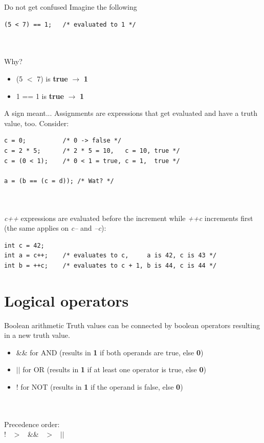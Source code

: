 \begin{frame}[fragile]{Do not get confused}
	Imagine the following
	\begin{lstlisting}[numbers=none]
(5 < 7) == 1;   /* evaluated to 1 */
\end{lstlisting}
\ \\\ \\Why?
\begin{itemize}
	\item<2-> (5 $<$ 7) is \textbf{true} $\rightarrow$ \textbf{1}
	\item<3-> 1 == 1 is \textbf{true} $\rightarrow$ \textbf{1}
\end{itemize}

\end{frame}
\begin{frame}[fragile]{A sign meant...}
	Assignments are expressions that get evaluated and have a truth value, too.
	Consider:
		\begin{lstlisting}[numbers=none]
c = 0;          /* 0 -> false */
c = 2 * 5;      /* 2 * 5 = 10,   c = 10, true */
c = (0 < 1);    /* 0 < 1 = true, c = 1,  true */

a = (b == (c = d)); /* Wat? */
\end{lstlisting}\ \\
	\pause
	\ \\\textit{c++} expressions are evaluated before the increment while \textit{++c} increments first (the same applies on \textit{c--} and \textit{--c}):
	\begin{lstlisting}[numbers=none]
int c = 42;
int a = c++;    /* evaluates to c,     a is 42, c is 43 */
int b = ++c;    /* evaluates to c + 1, b is 44, c is 44 */
\end{lstlisting}
\end{frame}
\section{Logical operators}

\begin{frame}{Boolean arithmetic}
	Truth values can be connected by boolean operators resulting in a new truth value.
	\begin{itemize}
		\item \&\& for AND (results in \textbf{1} if both operands are true, else \textbf{0})
		\item $||$ for OR (results in \textbf{1} if at least one operator is true, else \textbf{0})
		\item ! for NOT (results in \textbf{1} if the operand is false, else \textbf{0})
	\end{itemize}
	\ \\\ \\Precedence order:\\
	\centering
	! \ $>$ \ \&\& \ $>$ \ $||$ 
\end{frame}

